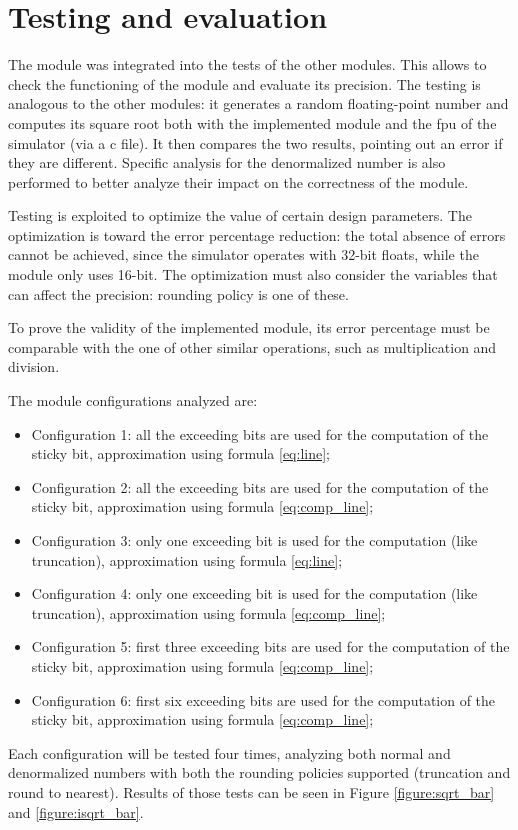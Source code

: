 \documentclass[paper=letter, fontsize=12pt]{article}
\begin{document}
\section{Testing and evaluation}
\label{section:test}

The module was integrated into the tests of the other modules. This allows to check the functioning of the module and evaluate its precision. The testing is analogous to the other modules: it generates a random floating-point number and computes its square root both with the implemented module and the fpu of the simulator (via a c file). It then compares the two results, pointing out an error if they are different. Specific analysis for the denormalized number is also performed to better analyze their impact on the correctness of the module.

Testing is exploited to optimize the value of certain design parameters. The optimization is toward the error percentage reduction: the total absence of errors cannot be achieved, since the simulator operates with 32-bit floats, while the module only uses 16-bit. The optimization must also consider the variables that can affect the precision: rounding policy is one of these.

To prove the validity of the implemented module, its error percentage must be comparable with the one of other similar operations, such as multiplication and division.

The module configurations analyzed are:
\begin{itemize}
    \item Configuration 1: all the exceeding bits are used for the computation of the sticky bit, approximation using formula \ref{eq:line};
    \item Configuration 2: all the exceeding bits are used for the computation of the sticky bit, approximation using formula \ref{eq:comp_line};
    \item Configuration 3: only one exceeding bit is used for the computation (like truncation), approximation using formula \ref{eq:line};
    \item Configuration 4: only one exceeding bit is used for the computation (like truncation), approximation using formula \ref{eq:comp_line};
    \item Configuration 5: first three exceeding bits are used for the computation of the sticky bit, approximation using formula \ref{eq:comp_line};
    \item Configuration 6: first six exceeding bits are used for the computation of the sticky bit, approximation using formula \ref{eq:comp_line};
\end{itemize}
Each configuration will be tested four times, analyzing both normal and denormalized numbers with both the rounding policies supported (truncation and round to nearest). Results of those tests can be seen in Figure \ref{figure:sqrt_bar} and \ref{figure:isqrt_bar}.
\end{document}
